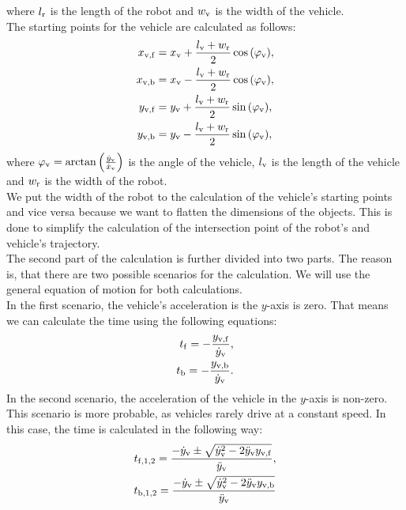         where $l_{\rm{r}}$ is the length of the robot and $w_{\rm{v}}$ is the width of the vehicle.\\
        The starting points for the vehicle are calculated as follows:
        \begin{align}
            x_{\rm{v,f}} &= x_{\rm{v}} + \frac{l_{\rm{v}}+w_{\rm{r}}}{2}\cos{(\varphi_{\rm{v}})},\\
            x_{\rm{v,b}} &= x_{\rm{v}} - \frac{l_{\rm{v}}+w_{\rm{r}}}{2}\cos{(\varphi_{\rm{v}})},\\
            y_{\rm{v,f}} &= y_{\rm{v}} + \frac{l_{\rm{v}}+w_{\rm{r}}}{2}\sin{(\varphi_{\rm{v}})},\\
            y_{\rm{v,b}} &= y_{\rm{v}} - \frac{l_{\rm{v}}+w_{\rm{r}}}{2}\sin{(\varphi_{\rm{v}})},
        \end{align}
        where $\varphi_{\rm{v}} = \arctan{\left(\frac{\dot{y}_{\rm{v}}}{\dot{x}_{\rm{v}}}\right)}$ is the angle of the vehicle, $l_{\rm{v}}$ is the length of the vehicle and $w_{\rm{r}}$ is the width of the robot.\\
        We put the width of the robot to the calculation of the vehicle's starting points and vice versa because we want to flatten the dimensions of the objects. This is done to simplify the calculation of the intersection point of the robot's and vehicle's trajectory.\\
        The second part of the calculation is further divided into two parts. The reason is, that there are two possible scenarios for the calculation. We will use the general equation of motion \cite{equation_motion} for both calculations.\\
        In the first scenario, the vehicle's acceleration is the $y$-axis is zero. That means we can calculate the time using the following equations:
        \begin{align}
            t_{\rm{f}} = -\frac{y_{\rm{v,f}}}{\dot{y}_{\rm{v}}},\\
            t_{\rm{b}} = -\frac{y_{\rm{v,b}}}{\dot{y}_{\rm{v}}}.
        \end{align}
        In the second scenario, the acceleration of the vehicle in the $y$-axis is non-zero. This scenario is more probable, as vehicles rarely drive at a constant speed. In this case, the time is calculated in the following way:
        \begin{align}
            t_{\rm{f},1,2} = \frac{-\dot{y}_{\rm{v}}\pm\sqrt{\dot{y}_{\rm{v}}^2-2\ddot{y}_{\rm{v}}y_{\rm{v,f}}}}{\ddot{y}_{\rm{v}}},\\
            t_{\rm{b},1,2} = \frac{-\dot{y}_{\rm{v}}\pm\sqrt{\dot{y}_{\rm{v}}^2-2\ddot{y}_{\rm{v}}y_{\rm{v,b}}}}{\ddot{y}_{\rm{v}}}
        \end{align}
